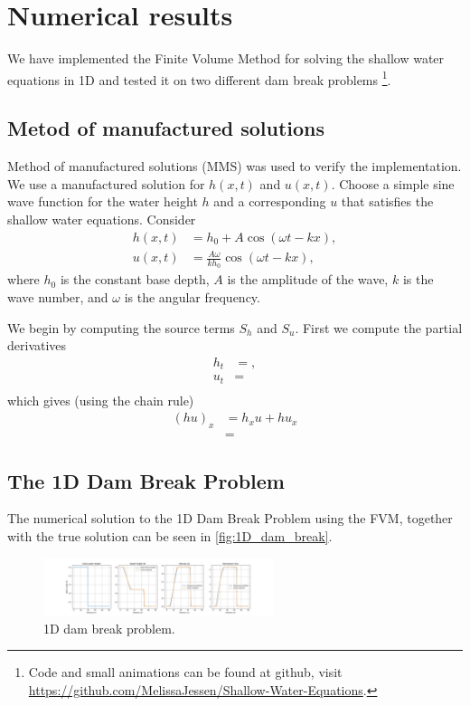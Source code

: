\chapter{Numerical results}
We have implemented the Finite Volume Method for solving the shallow water equations in 1D and tested it on two different dam break problems
\footnote{Code and small animations can be found at github, visit \url{https://github.com/MelissaJessen/Shallow-Water-Equations}.}.

\section{Metod of manufactured solutions}
Method of manufactured solutions (MMS) was used to verify the implementation.
We use a manufactured solution for $h(x,t)$ and $u(x,t)$.
Choose a simple sine wave function for the water height $h$ and a corresponding $u$ that satisfies the shallow water equations.
Consider
\begin{align*}
    h(x,t) &= h_0 + A \cos(\omega t - kx), \\
    u(x,t) &= \frac{ A \omega }{k h_0}  \cos(\omega t - kx),
\end{align*} 
where $h_0$ is the constant base depth, $A$ is the amplitude of the wave, $k$ is the wave number, and $\omega$ is the angular frequency.

We begin by computing the source terms $S_h$ and $S_u$.
First we compute the partial derivatives
\begin{align*}
    h_t &= ,\\
    u_t &=  \\
\end{align*}
which gives (using the chain rule)
\begin{align*}
    {(hu)}_x &= h_x u + h u_x \\
    &= 
\end{align*}

\section{The 1D Dam Break Problem}
The numerical solution to the 1D Dam Break Problem using the FVM, together with the true solution can be seen in \autoref{fig:1D_dam_break}.

\begin{figure}[H]
    \centering
    \includegraphics[width=0.6\textwidth]{plots/sol_1D_val.png}
    \caption{1D dam break problem.}\label{fig:1D_dam_break}
\end{figure}


